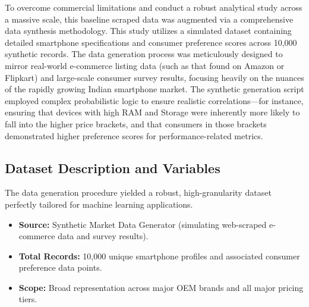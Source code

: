 \documentclass[12pt,a4paper]{article}
\begin{document}
To overcome commercial limitations and conduct a robust analytical study across a massive scale, this baseline scraped data was augmented via a comprehensive data synthesis methodology. This study utilizes a simulated dataset containing detailed smartphone specifications and consumer preference scores across 10,000 synthetic records. The data generation process was meticulously designed to mirror real-world e-commerce listing data (such as that found on Amazon or Flipkart) and large-scale consumer survey results, focusing heavily on the nuances of the rapidly growing Indian smartphone market. The synthetic generation script employed complex probabilistic logic to ensure realistic correlations—for instance, ensuring that devices with high RAM and Storage were inherently more likely to fall into the higher price brackets, and that consumers in those brackets demonstrated higher preference scores for performance-related metrics.

\subsection{Dataset Description and Variables}
The data generation procedure yielded a robust, high-granularity dataset perfectly tailored for machine learning applications. 
\begin{itemize}
    \item \textbf{Source:} Synthetic Market Data Generator (simulating web-scraped e-commerce data and survey results).
    \item \textbf{Total Records:} 10,000 unique smartphone profiles and associated consumer preference data points.
    \item \textbf{Scope:} Broad representation across major OEM brands and all major pricing tiers.
\end{itemize}
\end{document}
